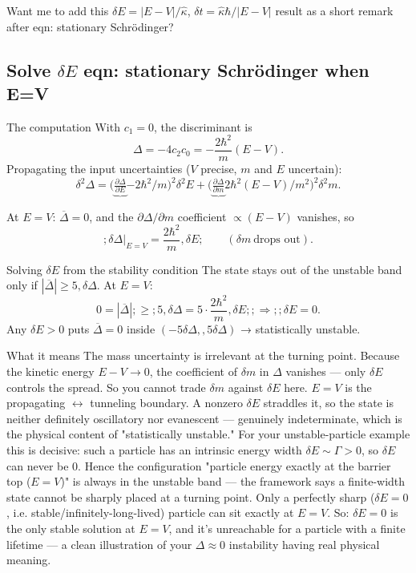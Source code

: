 \documentclass[twoside]{article}
\numberwithin{equation}{section}
\begin{document}
Want me to add this $\delta E=|E-V|/\hat\kappa$, $\delta t=\hat\kappa\hbar/|E-V|$ result as a short remark after eqn: stationary Schrödinger?


\subsection{Solve $\delta E$ {eqn: stationary Schrödinger} when E=V}

The computation
With $c_1=0$, the discriminant is
$$\Delta = -4c_2c_0 = -\frac{2\hbar^2}{m}(E-V).$$
Propagating the input uncertainties ($V$ precise, $m$ and $E$ uncertain):
$$\delta^2\Delta = \Big(\underbrace{\tfrac{\partial\Delta}{\partial E}}{-2\hbar^2/m}\Big)^2\delta^2 E + \Big(\underbrace{\tfrac{\partial\Delta}{\partial m}}{2\hbar^2(E-V)/m^2}\Big)^2\delta^2 m .$$

At $E=V$: $\overline{\Delta}=0$, and the $\partial\Delta/\partial m$ coefficient $\propto (E-V)$ vanishes, so
$$\boxed{;\delta\Delta\big|_{E=V} = \frac{2\hbar^2}{m},\delta E;}\qquad(\delta m\ \text{drops out}).$$

Solving $\delta E$ from the stability condition
The state stays out of the unstable band only if $|\overline{\Delta}| \ge 5,\delta\Delta$. At $E=V$:
$$0 = |\overline{\Delta}| ;\ge; 5,\delta\Delta = 5\cdot\frac{2\hbar^2}{m},\delta E ;;\Longrightarrow;; \boxed{\delta E = 0}.$$
Any $\delta E>0$ puts $\overline{\Delta}=0$ inside $(-5\delta\Delta,,5\delta\Delta)$ → statistically unstable.

What it means
The mass uncertainty is irrelevant at the turning point. Because the kinetic energy $E-V\to0$, the coefficient of $\delta m$ in $\Delta$ vanishes --- only $\delta E$ controls the spread. So you cannot trade $\delta m$ against $\delta E$ here.
$E=V$ is the propagating $\leftrightarrow$ tunneling boundary. A nonzero $\delta E$ straddles it, so the state is neither definitely oscillatory nor evanescent — genuinely indeterminate, which is the physical content of "statistically unstable."
For your unstable-particle example this is decisive: such a particle has an intrinsic energy width $\delta E\sim\Gamma>0$, so $\delta E$ can never be $0$. Hence the configuration "particle energy exactly at the barrier top ($E=V$)" is always in the unstable band — the framework says a finite-width state cannot be sharply placed at a turning point. Only a perfectly sharp ($\delta E=0$, i.e. stable/infinitely-long-lived) particle can sit exactly at $E=V$.
So: $\delta E=0$ is the only stable solution at $E=V$, and it's unreachable for a particle with a finite lifetime — a clean illustration of your $\Delta\approx0$ instability having real physical meaning.
\end{document}
